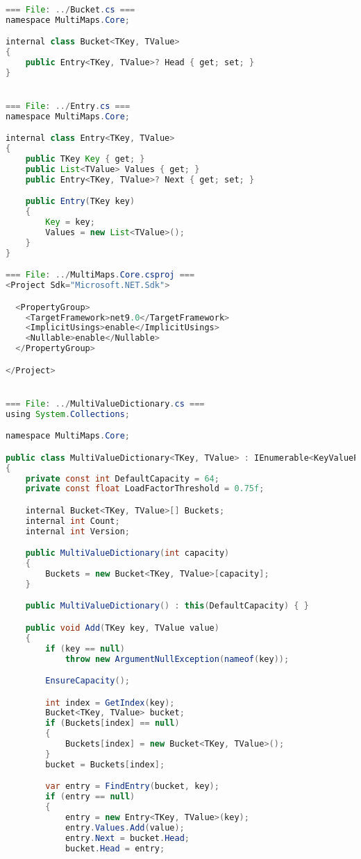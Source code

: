 \documentclass[12pt]{article}
\begin{document}
\begin{lstlisting}[language=Java]

=== File: ../Bucket.cs ===
namespace MultiMaps.Core;

internal class Bucket<TKey, TValue>
{
    public Entry<TKey, TValue>? Head { get; set; }
}


=== File: ../Entry.cs ===
namespace MultiMaps.Core;

internal class Entry<TKey, TValue>
{
    public TKey Key { get; }
    public List<TValue> Values { get; }
    public Entry<TKey, TValue>? Next { get; set; }

    public Entry(TKey key)
    {
        Key = key;
        Values = new List<TValue>();
    }
}

=== File: ../MultiMaps.Core.csproj ===
<Project Sdk="Microsoft.NET.Sdk">

  <PropertyGroup>
    <TargetFramework>net9.0</TargetFramework>
    <ImplicitUsings>enable</ImplicitUsings>
    <Nullable>enable</Nullable>
  </PropertyGroup>

</Project>


=== File: ../MultiValueDictionary.cs ===
using System.Collections;

namespace MultiMaps.Core;

public class MultiValueDictionary<TKey, TValue> : IEnumerable<KeyValuePair<TKey, TValue>>
{
    private const int DefaultCapacity = 64;
    private const float LoadFactorThreshold = 0.75f;

    internal Bucket<TKey, TValue>[] Buckets;
    internal int Count;
    internal int Version;

    public MultiValueDictionary(int capacity)
    {
        Buckets = new Bucket<TKey, TValue>[capacity];
    }

    public MultiValueDictionary() : this(DefaultCapacity) { }

    public void Add(TKey key, TValue value)
    {
        if (key == null)
            throw new ArgumentNullException(nameof(key));

        EnsureCapacity();

        int index = GetIndex(key);
        Bucket<TKey, TValue> bucket;
        if (Buckets[index] == null)
        {
            Buckets[index] = new Bucket<TKey, TValue>();
        }
        bucket = Buckets[index];

        var entry = FindEntry(bucket, key);
        if (entry == null)
        {
            entry = new Entry<TKey, TValue>(key);
            entry.Values.Add(value);
            entry.Next = bucket.Head;
            bucket.Head = entry;


\end{lstlisting}
\end{document}
